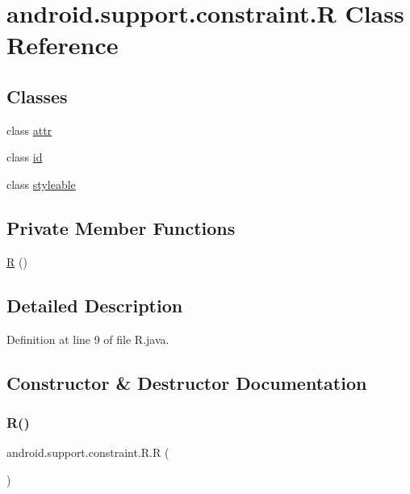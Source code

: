 \hypertarget{classandroid_1_1support_1_1constraint_1_1_r}{}\section{android.\+support.\+constraint.\+R Class Reference}
\label{classandroid_1_1support_1_1constraint_1_1_r}
\subsection*{Classes}
\begin{DoxyCompactItemize}
\item 
class \mbox{\hyperlink{classandroid_1_1support_1_1constraint_1_1_r_1_1attr}{attr}}
\item 
class \mbox{\hyperlink{classandroid_1_1support_1_1constraint_1_1_r_1_1id}{id}}
\item 
class \mbox{\hyperlink{classandroid_1_1support_1_1constraint_1_1_r_1_1styleable}{styleable}}
\end{DoxyCompactItemize}
\subsection*{Private Member Functions}
\begin{DoxyCompactItemize}
\item 
\mbox{\hyperlink{classandroid_1_1support_1_1constraint_1_1_r_a3a5f7ff14dd944c2f20f0d8b2a38b81a}{R}} ()
\end{DoxyCompactItemize}


\subsection{Detailed Description}


Definition at line 9 of file R.\+java.



\subsection{Constructor \& Destructor Documentation}
\mbox{\label{classandroid_1_1support_1_1constraint_1_1_r_a3a5f7ff14dd944c2f20f0d8b2a38b81a}} 
\subsubsection{\texorpdfstring{R()}{R()}}
{\footnotesize\ttfamily android.\+support.\+constraint.\+R.\+R (\begin{DoxyParamCaption}{ }\end{DoxyParamCaption})\hspace{0.3cm}{\ttfamily [private]}}



